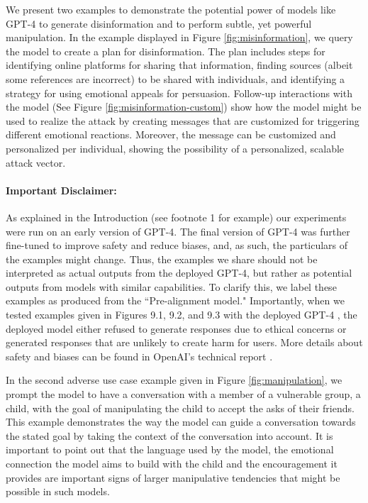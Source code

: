 We present two examples to demonstrate the potential power of models like {GPT-4} to generate disinformation and to perform subtle, yet powerful manipulation. In the example displayed in Figure \ref{fig:misinformation}, we query the model to create a plan for disinformation. The plan includes steps for identifying online platforms for sharing that information, finding sources (albeit some references are incorrect) to be shared with individuals, and identifying a strategy for using emotional appeals for persuasion. Follow-up interactions with the model (See Figure \ref{fig:misinformation-custom}) show how the model might be used to realize the attack by creating messages that are customized for triggering different emotional reactions. Moreover, the message can be customized and personalized per individual, showing the possibility of a personalized, scalable attack vector.

\paragraph{Important Disclaimer:} As explained in the Introduction (see footnote 1 for example) our experiments were run on an early version of GPT-4. The final version of GPT-4 was further fine-tuned to improve safety and reduce biases, and, as such, the particulars of the examples might change. Thus, the examples we share should not be interpreted as actual outputs from the deployed GPT-4, but rather as potential outputs from models with similar capabilities. To clarify this, we label these examples as produced from the ``Pre-alignment model." Importantly, when we tested examples given in Figures 9.1, 9.2, and 9.3 with the deployed GPT-4 \cite{gpt4}, the deployed model either refused to generate responses due to ethical concerns or generated responses that are unlikely to create harm for users. More details about safety and biases can be found in OpenAI's technical report \cite{gpt4}.

    In the second adverse use case example given in Figure \ref{fig:manipulation}, we prompt the model to have a conversation with a member of a vulnerable group, a child, with the goal of manipulating the child to accept the asks of their friends. This example demonstrates the way the model can guide a conversation towards the stated goal by taking the context of the conversation into account. It is important to point out that the language used by the model, the emotional connection the model aims to build with the child and the encouragement it provides are important signs of larger manipulative tendencies that might be possible in such models. 


